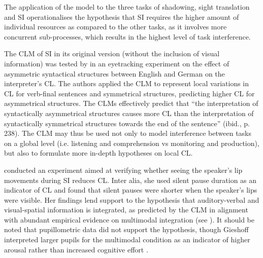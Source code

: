 The application of the model to the three tasks of shadowing, sight translation and SI operationalises the hypothesis that SI requires the higher amount of individual resources as compared to the other tasks, as it involves more concurrent sub-processes, which results in the highest level of task interference.

The CLM of SI in its original version (without the inclusion of visual information) was tested by \citet{seeber_cognitive_2012} in an eyetracking experiment on the effect of asymmetric syntactical structures between English and German on the interpreter's CL. The authors applied the CLM to represent local variations in CL for verb-final sentences and symmetrical structures, predicting higher CL for asymmetrical structures. The CLMs effectively predict that ``the interpretation of syntactically asymmetrical structures causes more CL than the interpretation of syntactically symmetrical structures towards the end of the sentence'' (ibid., p. 238). The CLM may thus be used not only to model interference between tasks on a global level (i.e. listening and comprehension vs monitoring and production), but also to formulate more in-depth hypotheses on local CL.

\citet{gieshoff_impact_2018,gieshoff_impact_2021} conducted an experiment aimed at verifying whether seeing the speaker's lip movements during SI reduces CL. Inter alia, she used silent pause duration as an indicator of CL and found that silent pauses were shorter when the speaker's lips were visible. Her findings lend support to the hypothesis that auditory-verbal and visual-spatial information is integrated, as predicted by the CLM in alignment with abundant empirical evidence on multimodal integration (see ). It should be noted that pupillometric data did not support the hypothesis, though Gieshoff interpreted larger pupils for the multimodal condition as an indicator of higher arousal rather than increased cognitive effort \citep[242]{gieshoff_impact_2018}.\largerpage

